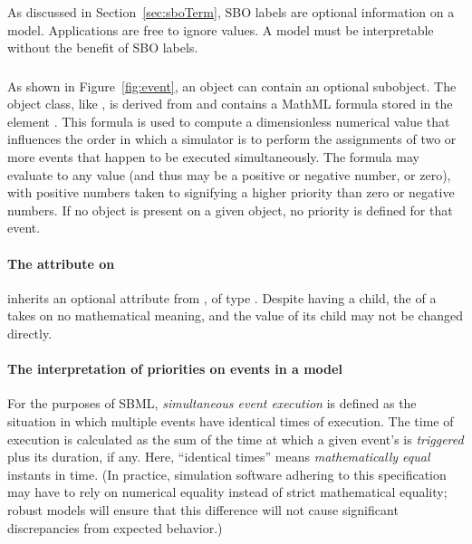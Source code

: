 As discussed in Section~\ref{sec:sboTerm}, SBO labels are optional
information on a model.  Applications are free to ignore
 values.  A model must be interpretable without the
benefit of SBO labels.

\subsubsection{}
\label{sec:event-priority}

As shown in Figure~\ref{fig:event}, an \Event object can contain
an optional \Priority subobject.  The \Priority object class, like
\Delay, is derived from \SBase and contains a MathML formula
stored in the element .  This formula is used to
compute a dimensionless numerical value that influences the order
in which a simulator is to perform the assignments of two or more
events that happen to be executed simultaneously.  The formula may
evaluate to any  value (and thus may be a positive
or negative number, or zero), with positive numbers taken to
signifying a higher priority than zero or negative numbers.  If no
\Priority object is present on a given \Event object, no priority
is defined for that event.

\begin{blockChanged}
\paragraph{The  attribute on }
\label{sec:priority-id}

\Priority inherits an optional  attribute from \SBase, of type .  Despite having a  child, the  of a \Priority takes on no mathematical meaning, and the value of its  child may not be changed directly.
\end{blockChanged}


\paragraph{The interpretation of priorities on events in a model}

For the purposes of SBML, \emph{simultaneous event execution} is
defined as the situation in which multiple events have identical
times of execution.  The time of execution is calculated as the
sum of the time at which a given event's \Trigger is \emph{triggered}
plus its \Delay duration, if any.  Here, ``identical times'' means
\emph{mathematically equal} instants in time.  (In practice,
simulation software adhering to this specification may have to
rely on numerical equality instead of strict mathematical
equality; robust models will ensure that this difference will not
cause significant discrepancies from expected behavior.)

